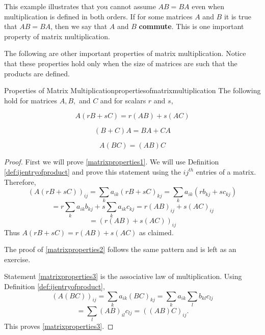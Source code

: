 This example illustrates that you cannot assume $AB=BA$ even when
multiplication is defined in both orders. If for some matrices $A$ and
$B$ it is true that $AB=BA$, then we say that $A$ and $B$ \textbf{commute}. This is one 
important property of matrix multiplication.

The following are other important properties of matrix multiplication.
Notice that these properties hold only when the size of matrices are such that the products are defined. 

\begin{proposition}{Properties of Matrix Multiplication}{propertiesofmatrixmultiplication}
The following hold for matrices $A,B,$ and $C$ and for scalars $r$ and $s$,

\begin{equation}
A\left( rB+sC\right) =r\left( AB\right) +s\left( AC\right)  \label{matrixproperties1}
\end{equation}

\begin{equation}
\left( B+C\right) A=BA+CA  \label{matrixproperties2}
\end{equation}

\begin{equation}
A\left( BC\right) =\left( AB\right) C  \label{matrixproperties3}
\end{equation}
\end{proposition}

\begin{proof}
 First we will prove \ref{matrixproperties1}. We will use Definition \ref{def:ijentryofproduct} 
and prove this statement using the $ij^{th}$ entries of a matrix. 
Therefore, 
\begin{equation*}
\left( A\left( rB+sC\right) \right) _{ij}=\sum_{k}a_{ik}\left( rB+sC\right)
_{kj}=\sum_{k}a_{ik}\left( rb_{kj}+sc_{kj}\right)
\end{equation*}
\begin{equation*}
=r\sum_{k}a_{ik}b_{kj}+s\sum_{k}a_{ik}c_{kj}=r\left( AB\right) _{ij}+s\left(
AC\right) _{ij}
\end{equation*}
\begin{equation*}
=\left( r\left( AB\right) +s\left( AC\right) \right) _{ij}
\end{equation*}
Thus $A\left( rB+sC\right) =r(AB)+s(AC)$ as claimed. 

The proof of \ref{matrixproperties2} follows the same pattern and is left as an exercise. 

Statement \ref{matrixproperties3} is the associative law of multiplication. Using
Definition \ref{def:ijentryofproduct},
\begin{equation*}
\left( A\left( BC\right) \right) _{ij}=\sum_{k}a_{ik}\left( BC\right)
_{kj}=\sum_{k}a_{ik}\sum_{l}b_{kl}c_{lj}
\end{equation*}
\begin{equation*}
=\sum_{l}\left( AB\right) _{il}c_{lj}=\left( \left( AB\right) C\right) _{ij}.
\end{equation*}
This proves \ref{matrixproperties3}.
\end{proof}
